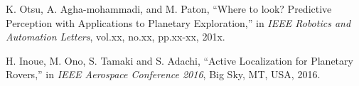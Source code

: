 \documentclass[conference]{IEEEtran}
\begin{document}
\begin{thebibliography}{1}

K. Otsu, A. Agha-mohammadi, and M. Paton, ``Where to look? Predictive Perception with Applications to Planetary Exploration,'' in {\it IEEE Robotics and Automation Letters}, vol.xx, no.xx, pp.xx-xx, 201x.

H. Inoue, M. Ono, S. Tamaki and S. Adachi, ``Active Localization for Planetary Rovers,'' in {\it IEEE Aerospace Conference 2016}, Big Sky, MT, USA, 2016.

\end{thebibliography}
\end{document}
